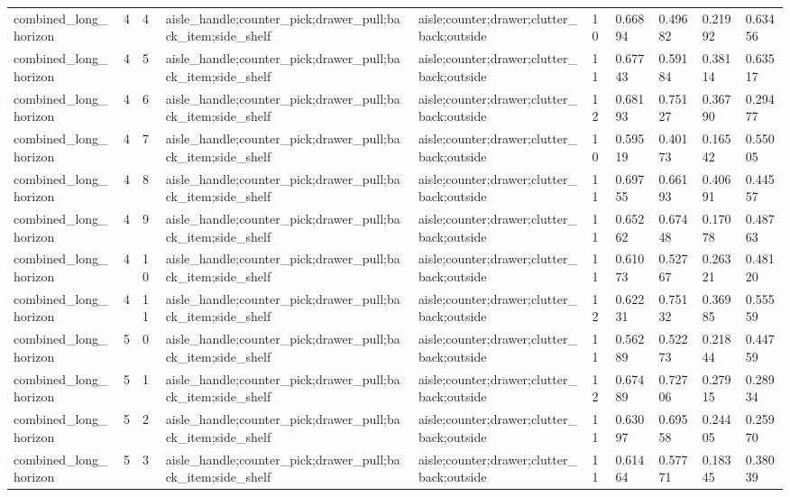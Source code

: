 \documentclass{article}
\begin{document}
\begin{table}[tbp]
{\begin{tabular}{llllllllll}
combined\_long\_horizon & 4 & 4 & aisle\_handle;counter\_pick;drawer\_pull;back\_item;side\_shelf & aisle;counter;drawer;clutter\_back;outside & 10 & 0.66894 & 0.49682 & 0.21992 & 0.63456 \\
combined\_long\_horizon & 4 & 5 & aisle\_handle;counter\_pick;drawer\_pull;back\_item;side\_shelf & aisle;counter;drawer;clutter\_back;outside & 11 & 0.67743 & 0.59184 & 0.38114 & 0.63517 \\
combined\_long\_horizon & 4 & 6 & aisle\_handle;counter\_pick;drawer\_pull;back\_item;side\_shelf & aisle;counter;drawer;clutter\_back;outside & 12 & 0.68193 & 0.75127 & 0.36790 & 0.29477 \\
combined\_long\_horizon & 4 & 7 & aisle\_handle;counter\_pick;drawer\_pull;back\_item;side\_shelf & aisle;counter;drawer;clutter\_back;outside & 10 & 0.59519 & 0.40173 & 0.16542 & 0.55005 \\
combined\_long\_horizon & 4 & 8 & aisle\_handle;counter\_pick;drawer\_pull;back\_item;side\_shelf & aisle;counter;drawer;clutter\_back;outside & 11 & 0.69755 & 0.66193 & 0.40691 & 0.44557 \\
combined\_long\_horizon & 4 & 9 & aisle\_handle;counter\_pick;drawer\_pull;back\_item;side\_shelf & aisle;counter;drawer;clutter\_back;outside & 11 & 0.65262 & 0.67448 & 0.17078 & 0.48763 \\
combined\_long\_horizon & 4 & 10 & aisle\_handle;counter\_pick;drawer\_pull;back\_item;side\_shelf & aisle;counter;drawer;clutter\_back;outside & 11 & 0.61073 & 0.52767 & 0.26321 & 0.48120 \\
combined\_long\_horizon & 4 & 11 & aisle\_handle;counter\_pick;drawer\_pull;back\_item;side\_shelf & aisle;counter;drawer;clutter\_back;outside & 12 & 0.62231 & 0.75132 & 0.36985 & 0.55559 \\
combined\_long\_horizon & 5 & 0 & aisle\_handle;counter\_pick;drawer\_pull;back\_item;side\_shelf & aisle;counter;drawer;clutter\_back;outside & 11 & 0.56289 & 0.52273 & 0.21844 & 0.44759 \\
combined\_long\_horizon & 5 & 1 & aisle\_handle;counter\_pick;drawer\_pull;back\_item;side\_shelf & aisle;counter;drawer;clutter\_back;outside & 12 & 0.67489 & 0.72706 & 0.27915 & 0.28934 \\
combined\_long\_horizon & 5 & 2 & aisle\_handle;counter\_pick;drawer\_pull;back\_item;side\_shelf & aisle;counter;drawer;clutter\_back;outside & 11 & 0.63097 & 0.69558 & 0.24405 & 0.25970 \\
combined\_long\_horizon & 5 & 3 & aisle\_handle;counter\_pick;drawer\_pull;back\_item;side\_shelf & aisle;counter;drawer;clutter\_back;outside & 11 & 0.61464 & 0.57771 & 0.18345 & 0.38039 \\
\bottomrule
\end{tabular}
}
\end{table}
\end{document}
